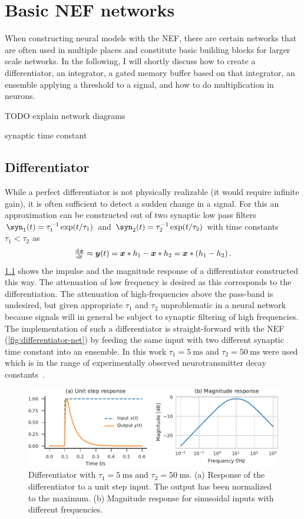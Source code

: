\chapter{Basic NEF networks}
When constructing neural models with the NEF, there are certain networks that are often used in multiple places and constitute basic building blocks for larger scale networks.
In the following, I will shortly discuss how to create a differentiator, an integrator, a gated memory buffer based on that integrator, an ensemble applying a threshold to a signal, and how to do multiplication in neurons.

TODO explain network diagrams

synaptic time constant


\section{Differentiator}
While a perfect differentiator is not physically realizable (it would require infinite gain), it is often sufficient to detect a sudden change in a signal.
For this an approximation can be constructed out of two synaptic low pass filters $\syn_1(t) =  \tau_1^{-1} \exp(t/\tau_1)$ and $\syn_2(t) = \tau_2^{-1} \exp(t/\tau_2)$ with time constants $\tau_1 < \tau_2$ as
\begin{equation}
    \od{\vc x}{t} \approx \vc y(t) = \vc x * h_1 - \vc x * h_2 = \vc x * \del{h_1 - h_2} \text{.}
\end{equation}
\cref{fig:differentiator} shows the impulse and the magnitude response of a differentiator constructed this way.
The attenuation of low frequency is desired as this corresponds to the differentiation.
The attenuation of high-frequencies above the pass-band is undesired, but given appropriate $\tau_1$ and $\tau_2$ unproblematic in a neural network because signals will in general be subject to synaptic filtering of high frequencies.
The implementation of such a differentiator is straight-forward with the NEF (\cref{fig:differentiator-net}) by feeding the same input with two different synaptic time constant into an ensemble.
In this work $\tau_1 = \SI{5}{\milli\second}$ and $\tau_2 = \SI{50}{\milli\second}$ were used which is in the range of experimentally observed neurotransmitter decay constants~\parencite{sah1990-1,moreno-bote2005}.
\begin{figure}
    \centering
    \includegraphics{figures/differentiator}
    \caption{Differentiator with $\tau_1 = \SI{5}{\milli\second}$ and $\tau_2 = \SI{50}{\milli\second}$. (a) Response of the differentiator to a unit step input. The output has been normalized to the maximum. (b) Magnitude response for sinusoidal inputs with different frequencies.}\label{fig:differentiator}
\end{figure}
